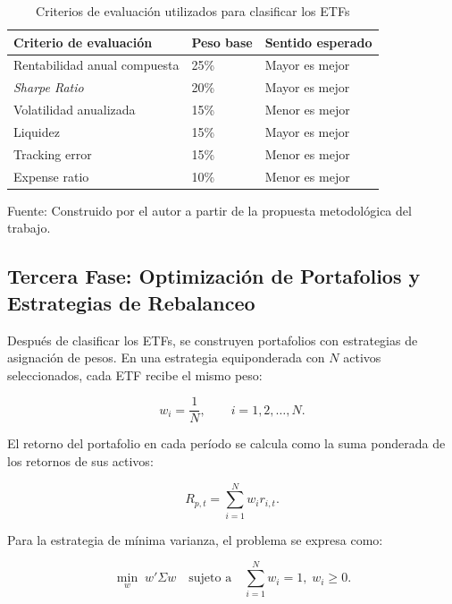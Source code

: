 \documentclass[12pt,letterpaper]{article}
\newcommand{\fuente}[1]{\begin{center}\small Fuente: #1\end{center}}
\begin{document}
\begin{table}[H]
\centering
\caption{Criterios de evaluación utilizados para clasificar los ETFs}
\label{tab:criterios_evaluacion}
\begin{tabular}{p{7cm}p{3cm}p{4cm}}
\toprule
\textbf{Criterio de evaluación} & \textbf{Peso base} & \textbf{Sentido esperado} \\
\midrule
Rentabilidad anual compuesta & 25\% & Mayor es mejor \\
\textit{Sharpe Ratio} & 20\% & Mayor es mejor \\
Volatilidad anualizada & 15\% & Menor es mejor \\
Liquidez & 15\% & Mayor es mejor \\
Tracking error & 15\% & Menor es mejor \\
Expense ratio & 10\% & Menor es mejor \\
\bottomrule
\end{tabular}
\end{table}
\fuente{Construido por el autor a partir de la propuesta metodológica del trabajo.}

\subsection{Tercera Fase: Optimización de Portafolios y Estrategias de Rebalanceo}

Después de clasificar los ETFs, se construyen portafolios con estrategias de asignación de pesos. En una estrategia equiponderada con $N$ activos seleccionados, cada ETF recibe el mismo peso:

\begin{equation}
w_i = \frac{1}{N}, \qquad i=1,2,\ldots,N.
\label{eq:equal_weight}
\end{equation}

El retorno del portafolio en cada período se calcula como la suma ponderada de los retornos de sus activos:

\begin{equation}
R_{p,t} = \sum_{i=1}^{N} w_i r_{i,t}.
\label{eq:retorno_portafolio}
\end{equation}

Para la estrategia de mínima varianza, el problema se expresa como:

\begin{equation}
\min_{w} \; w'\Sigma w
\quad \text{sujeto a} \quad
\sum_{i=1}^{N} w_i = 1, \; w_i \geq 0.
\label{eq:minvar}
\end{equation}
\end{document}
